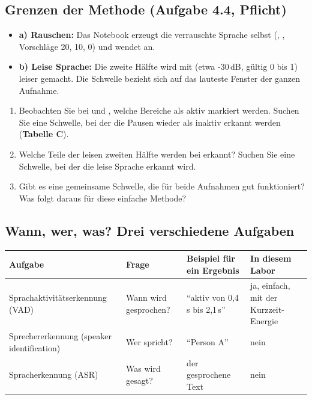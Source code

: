 \documentclass[11pt]{article}
\begin{document}
\subsection[Grenzen der Methode]{Grenzen der Methode (Aufgabe 4.4, Pflicht)}


\begin{itemize}
  \item \textbf{a) Rauschen:} Das Notebook erzeugt die verrauschte Sprache selbst (, , Vorschläge 20, 10, 0) und wendet  an.
  \item \textbf{b) Leise Sprache:} Die zweite Hälfte wird mit  (etwa -30\,dB, gültig 0 bis 1) leiser gemacht. Die Schwelle  bezieht sich auf das lauteste Fenster der ganzen Aufnahme.
\end{itemize}

\begin{block}
\begin{enumerate}
  \item Beobachten Sie bei  und , welche Bereiche als aktiv markiert werden. Suchen Sie eine Schwelle, bei der die Pausen wieder als inaktiv erkannt werden (\textbf{Tabelle C}).
  \item Welche Teile der leisen zweiten Hälfte werden bei  erkannt? Suchen Sie eine Schwelle, bei der die leise Sprache erkannt wird.
  \item Gibt es eine gemeinsame Schwelle, die für beide Aufnahmen gut funktioniert? Was folgt daraus für diese einfache Methode?
\end{enumerate}
\end{block}

\subsection{Wann, wer, was? Drei verschiedene Aufgaben}

{\small
\begin{tabularx}{\linewidth}{|L{3.9cm}|L{2.4cm}|Y|L{3.0cm}|}
  \hline
  \textbf{Aufgabe} & \textbf{Frage} & \textbf{Beispiel für ein Ergebnis} & \textbf{In diesem Labor} \\ \hline
  Sprach\-aktivitäts\-erkennung (VAD) & Wann wird gesprochen? & "`aktiv von 0,4\,s bis 2,1\,s"' & ja, einfach, mit der Kurzzeit-Energie \\ \hline
  Sprechererkennung (speaker identification) & Wer spricht? & "`Person A"' & nein \\ \hline
  Spracherkennung (ASR) & Was wird gesagt? & der gesprochene Text & nein \\ \hline
\end{tabularx}}
\end{document}

